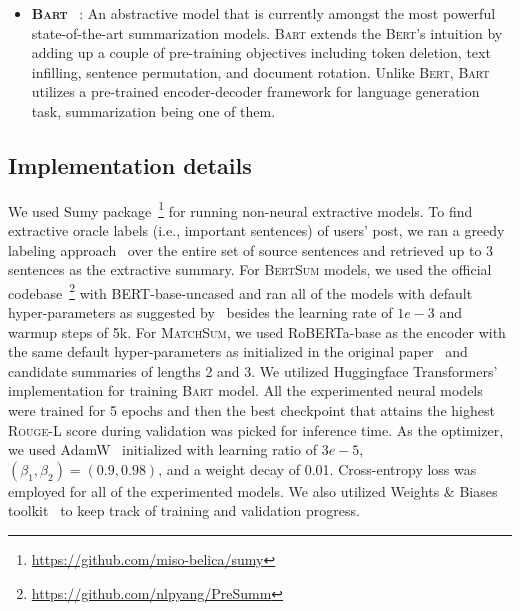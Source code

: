 \documentclass[10pt, a4paper]{article}
\newcommand{\bart}{\textsc{Bart}}
\newcommand{\rgl}{\textsc{Rouge-L}}
\begin{document}
\begin{itemize}[leftmargin=*,label={-}]
\item \textsc{\textbf{Bart}} ~\cite{Lewis2020BARTDS}: An abstractive model that is currently amongst the most powerful state-of-the-art summarization models. \bart{} extends the \textsc{Bert}'s intuition by adding up a couple of pre-training objectives including token deletion, text infilling, sentence permutation, and document rotation. Unlike \textsc{Bert}, \bart{} utilizes a pre-trained encoder-decoder framework for language generation task,  summarization being one of them.

\end{itemize}



\subsection{Implementation details}

We used Sumy package~\footnote{\url{https://github.com/miso-belica/sumy}} for running non-neural extractive models. To find extractive oracle labels (i.e., important sentences) of users' post, we ran a greedy labeling approach~\cite{Liu2019TextSW} over the entire set of source sentences and retrieved up to 3 sentences as the extractive summary. For \textsc{BertSum} models, we used the official codebase~\footnote{\url{https://github.com/nlpyang/PreSumm}} with {\selectfont BERT-base-uncased} and ran all of the models with default hyper-parameters as suggested by~ besides the learning rate of $1e-3$ and warmup steps of 5k. For \textsc{MatchSum}, we used  {\selectfont RoBERTa-base} as the encoder with the same default hyper-parameters as initialized in the original paper~\cite{Zhong2020ExtractiveSA} and candidate summaries of lengths 2 and 3.  We utilized Huggingface Transformers'~\cite{Wolf2020Transformers} implementation for training \bart{} model. All the experimented neural models were trained for 5 epochs and then the best checkpoint that attains the highest \rgl{} score during validation was picked for inference time. As the optimizer, we used AdamW~\cite{Loshchilov2019DecoupledWD} initialized with learning ratio of $3e-5$, $(\beta_1, \beta_2)= (0.9, 0.98)$, and a weight decay of 0.01. Cross-entropy loss was employed for all of the experimented models. We also utilized Weights \& Biases toolkit~\cite{wandb} to keep track of training and validation progress. 
 
\end{document}
